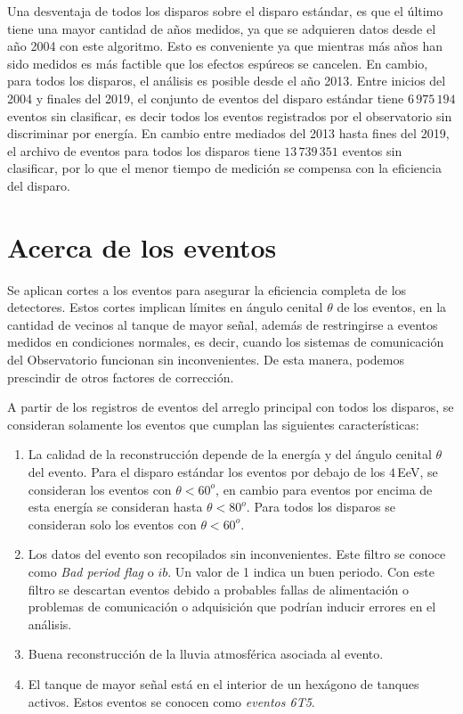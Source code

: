 Una desventaja de todos los disparos sobre el disparo estándar, es que el último tiene una mayor cantidad de años medidos, ya que se adquieren datos  desde el año 2004 con este algoritmo. Esto es conveniente ya que mientras más años han sido medidos es más factible que los efectos espúreos se cancelen. En cambio, para todos los disparos, el análisis  es posible desde el año 2013. Entre inicios del 2004 y finales del 2019, el conjunto de eventos del disparo estándar tiene $6\,975\,194$ eventos sin clasificar, es decir todos los eventos registrados por el observatorio sin discriminar por energía. En cambio entre mediados del 2013 hasta fines del 2019, el archivo de eventos para todos los disparos tiene $13\,739\,351$ eventos sin clasificar, por lo que el menor tiempo de medición se compensa con la eficiencia del disparo.


\section{Acerca de los eventos} \label{filtro}

Se aplican cortes a los eventos para asegurar la eficiencia completa de los detectores. Estos cortes implican límites en ángulo cenital $\theta$ de los eventos, en la cantidad de vecinos al tanque de mayor señal, además de restringirse a eventos medidos en condiciones normales, es decir, cuando los sistemas de comunicación del Observatorio funcionan sin inconvenientes. De esta manera, podemos prescindir de otros factores de corrección.

A partir de los registros de eventos del arreglo principal con todos los disparos, se consideran solamente los eventos que cumplan las siguientes características:

    \begin{enumerate}
      \item La calidad de la reconstrucción depende de la energía y del ángulo cenital $\theta$ del evento.  Para el disparo estándar los eventos por debajo de los $4\,$EeV, se consideran los eventos con $\theta < 60^o$, en cambio para eventos por encima de esta energía se consideran hasta $\theta < 80^o$. Para todos los disparos se consideran solo los eventos con $\theta<60^o$.
      \item Los datos del evento son recopilados sin inconvenientes. Este filtro se conoce como \emph{Bad period flag} o $ib$. Un valor de 1 indica un buen periodo. Con este filtro se descartan eventos debido a probables fallas de alimentación o problemas de comunicación o adquisición que podrían inducir errores en el análisis.
      \item Buena reconstrucción de la lluvia atmosférica asociada al evento.
      \item El tanque de mayor señal está en el interior de un hexágono de tanques activos. Estos eventos se conocen como \textit{eventos 6T5}.
    \end{enumerate}


